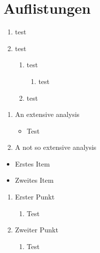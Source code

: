 \documentclass[10pt, a4paper]{article}
\begin{document}
\section{Auflistungen}
\blindtext

\begin{enumerate}
  \item test
  \item test
  \begin{enumerate}
    \item test
    \begin{enumerate}
      \item test
    \end{enumerate}
    \item test
  \end{enumerate}
\end{enumerate}
\begin{enumerate}
  \item  An extensive analysis 
   \begin{itemize}
     \item Test
   \end{itemize}
 \item A not so extensive analysis
\end{enumerate}

\blindtext

\begin{itemize}
  \item Erstes Item
  \item[\ding{43}] Zweites Item
\end{itemize}


\begin{enumerate}
  \item Erster Punkt
  \begin{enumerate}
    \item Test
  \end{enumerate}
  \item Zweiter Punkt
  \begin{enumerate}
    \item Test
  \end{enumerate}
\end{enumerate}
\end{document}
